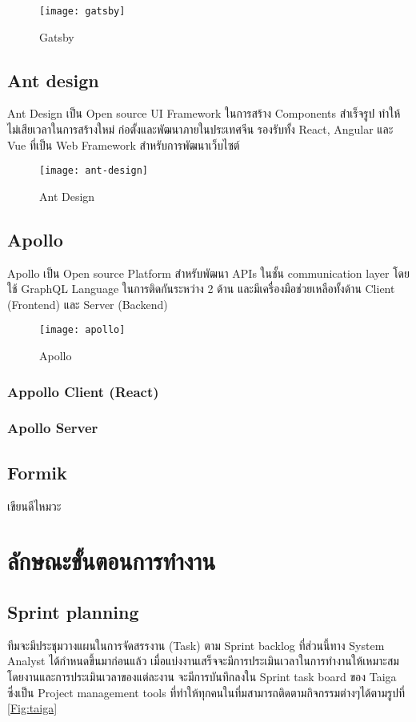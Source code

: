 \begin{figure}[!h]
	\centering
	\texttt{[image: gatsby]}
	\caption{Gatsby}
	\label{Fig:gatsby}
\end{figure}

\subsection{Ant design}
Ant Design เป็น Open source UI Framework ในการสร้าง Components สำเร็จรูป ทำให้ไม่เสียเวลาในการสร้างใหม่
ก่อตั้งและพัฒนาภายในประเทศจีน รองรับทั้ง React, Angular และ Vue ที่เป็น Web Framework สำหรับการพัฒนาเว็บไซต์
\begin{figure}[!h]
	\centering
	\texttt{[image: ant-design]}
	\caption{Ant Design}
	\label{Fig:ant-design}
\end{figure}
\subsection{Apollo}
Apollo เป็น Open source Platform สำหรับพัฒนา APIs ในชั้น communication layer 
โดยใช้ GraphQL Language ในการติดกันระหว่าง 2 ด้าน และมีเครื่องมือช่วยเหลือทั้งด้าน Client (Frontend) และ Server (Backend)

\begin{figure}[!h]
	\centering
	\texttt{[image: apollo]}
	\caption{Apollo}
	\label{Fig:apollo}
\end{figure}
\subsubsection{Appollo Client (React)}

\subsubsection{Apollo Server}

\subsection{Formik}
เขียนดีไหมวะ


\section{ลักษณะขั้นตอนการทำงาน}
\subsection{Sprint planning}
ทีมจะมีประชุมวางแผนในการจัดสรรงาน (Task) ตาม Sprint backlog ที่ส่วนนี้ทาง System Analyst ได้กำหนดขึ้นมาก่อนแล้ว เมื่อแบ่งงานเสร็จจะมีการประเมินเวลาในการทำงานให้เหมาะสม โดยงานและการประเมินเวลาของแต่ละงาน จะมีการบันทึกลงใน Sprint task board ของ Taiga ซึ่งเป็น Project management tools ที่ทำให้ทุกคนในที่มสามารถติดตามกิจกรรมต่างๆได้ตามรูปที่ \ref{Fig:taiga}
